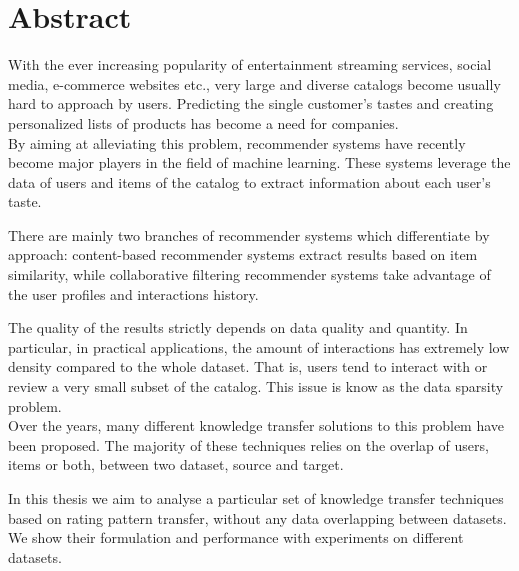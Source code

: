 \chapter*{Abstract}

With the ever increasing popularity of entertainment streaming services, social media, e-commerce websites etc., very large and diverse catalogs become usually hard to approach by users. Predicting the single customer's tastes and creating personalized lists of products has become a need for companies.\\
By aiming at alleviating this problem, recommender systems have recently become major players in the field of machine learning. These systems leverage the data of users and items of the catalog to extract information about each user's taste.\par
There are mainly two branches of recommender systems which differentiate by approach:
content-based recommender systems extract results based on item similarity, while collaborative filtering recommender systems take advantage of the user profiles and interactions history.\par
The quality of the results strictly depends on data quality and quantity. In particular, in practical applications, the amount of interactions has extremely low density compared to the whole dataset. That is, users tend to interact with or review a very small subset of the catalog. This issue is know as the data sparsity problem.\\
Over the years, many different knowledge transfer solutions to this problem have been proposed. The majority of these techniques relies on the overlap of users, items or both, between two dataset, source and target.\par
In this thesis we aim to analyse a particular set of knowledge transfer techniques based on rating pattern transfer, without any data overlapping between datasets. We show their formulation and performance with experiments on different datasets.